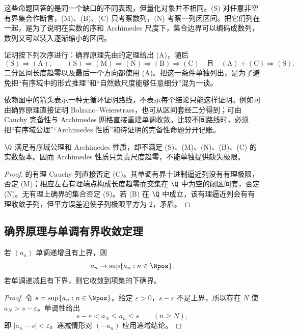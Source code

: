 这些命题回答的是同一个缺口的不同表现，但量化对象并不相同。(S) 对任意非空有界集合作断言，(M)、(B)、(C) 只考察数列，(N) 考察一列闭区间。把它们列在一起，是为了说明在实数的序和 Archimedes 尺度下，集合边界可以编码成数列，数列又可以装入逐渐缩小的区间。

证明按下列次序进行：确界原理先由的定理给出 (A)，随后
\[
 \mathrm{(S)}\Longrightarrow\mathrm{(A)},\qquad
 \mathrm{(S)}\Longrightarrow\mathrm{(M)}
 \Longrightarrow\mathrm{(N)}
 \Longrightarrow\mathrm{(B)}
 \Longrightarrow\mathrm{(C)}
 \quad\text{且}\quad
 \mathrm{(A)}+\mathrm{(C)}\Longrightarrow\mathrm{(S)}.
\]
二分区间长度趋零以及最后一个方向都使用 (A)。把这一条件单独列出，是为了避免把“有序域中的形式推理”和“自然数尺度能够任意细分”混为一谈。

依赖图中的箭头表示一种无循环证明路线，不表示每个结论只能这样证明。例如可由确界原理直接证明 Bolzano--Weierstrass，也可从区间套经二分得到；可由 Cauchy 完备性与 Archimedes 网格直接重建单调收敛。比较不同路线时，必须把“有序域公理”“Archimedes 性质”和待证明的完备性命题分开记账。

\begin{proposition}[有理数中的失败]
\(\Q\) 满足有序域公理和 Archimedes 性质，却不满足 (S)、(M)、(N)、(B)、(C) 的实数版本。因而 Archimedes 性质只负责尺度趋零，不能单独提供缺失极限。
\end{proposition}

\begin{proof}
的有理 Cauchy 列直接否定 (C)。其单调有界十进制逼近列没有有理极限，否定 (M)；相应左右有理端点构成长度趋零而交集在 \(\Q\) 中为空的闭区间套，否定 (N)。无有理上确界的集合否定 (S)。若 (B) 在 \(\Q\) 中成立，该有理逼近列会有有理收敛子列，但平方误差迫使子列极限平方为 \(2\)，矛盾。
\end{proof}

\subsection{确界原理与单调有界收敛定理}


\begin{theorem}[单调有界收敛]
若 \((a_n)\) 单调递增且有上界，则
\[
a_n\to\sup\{a_n:n\in\Npos\}.
\]
若单调递减且有下界，则它收敛到项集的下确界。
\end{theorem}

\begin{proof}
令 \(s=\sup\{a_n:n\in\Npos\}\)。给定 \(\varepsilon>0\)，\(s-\varepsilon\) 不是上界，所以存在 \(N\) 使 \(a_N>s-\varepsilon\)。单调性给出
\[
 s-\varepsilon<a_N\le a_n\le s\qquad(n\ge N),
\]
即 \(|a_n-s|<\varepsilon\)。递减情形对 \((-a_n)\) 应用递增结论。
\end{proof}

